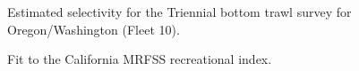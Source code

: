 \documentclass[
]{scrartcl}
\begin{document}
\begin{figure}


\caption{\label{fig-sel10}Estimated selectivity for the Triennial bottom
trawl survey for Oregon/Washington (Fleet 10).}

\end{figure}%

\clearpage

\begin{figure}


\caption{\label{fig-indexfit3}Fit to the California MRFSS recreational
index.}

\end{figure}%
\end{document}
